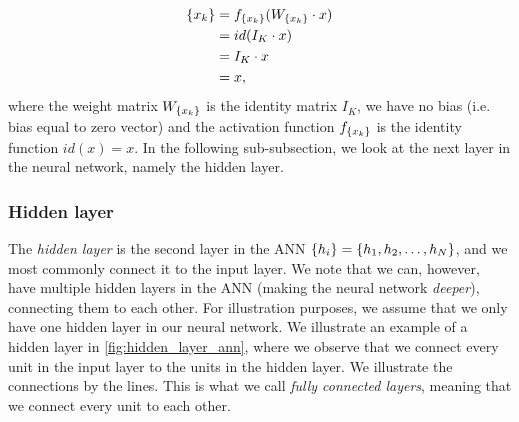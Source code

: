 \begin{align}
    \label{eqn:input_layer_ann}
    \left\{ {x}_{k} \right\}
    &= f_{\left\{ {x}_{k} \right\}}(W_{\left\{ {x}_{k} \right\}} \cdot x) \\
    &= id(I_K \cdot x) \notag \\ 
    &= I_K \cdot x \notag \\
    &= x, \notag
\end{align}
where the weight matrix $W_{\left\{ {x}_{k} \right\}}$ is the identity matrix $I_K$, we have no bias (i.e. bias equal to zero vector) and the activation function $f_{\left\{ {x}_{k} \right\}}$ is the identity function $id(x)=x$. In the following sub-subsection, we look at the next layer in the neural network, namely the hidden layer.

\subsubsection{Hidden layer}
\label{sec:ann-hidden-layer}
The \textit{hidden layer} is the second layer in the ANN $\left\{ {h}_{i} \right\} = \left\{ h_1, h_2, \ldots, h_N \right\}$, and we most commonly connect it to the input layer. We note that we can, however, have multiple hidden layers in the ANN (making the neural network \textit{deeper}), connecting them to each other. For illustration purposes, we assume that we only have one hidden layer in our neural network. We illustrate an example of a hidden layer in \cref{fig:hidden_layer_ann}, where we observe that we connect every unit in the input layer to the units in the hidden layer. We illustrate the connections by the lines. This is what we call \textit{fully connected layers}, meaning that we connect every unit to each other.


